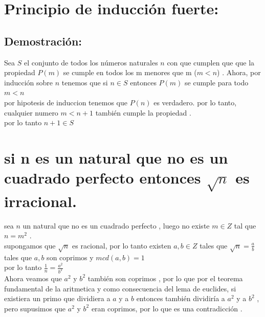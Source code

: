 \documentclass[10pt,a4paper]{article} %
\begin{document}
    \title{\rmfamily\normalfont{}}
    \author{}
    \date{\today}

    \maketitle


    \section{Principio de inducción fuerte:}
        \subsection{Demostración:}
            Sea $ S  $  el conjunto de todos los números naturales $ n  $  con
            que cumplen que
            que la propiedad  $ P(m)  $  se cumple en todos los m menores que m
            ($ m < n  $)
            .  Ahora, por inducción sobre $ n  $ tenemos que si $ n \in S  $
            entonces $ P(m)  $  se cumple para todo $ m < n  $
            \\ por hipotesis de induccion tenemos que $ P(n)  $ es verdadero.
            por lo tanto, cualquier numero $ m < n+1  $ también cumple la propiedad .
            \\ por lo tanto $ n +1 \in S  $
    \section{si n es un natural que no es un cuadrado perfecto entonces $ \sqrt{n}  $   es irracional.}
        sea $ n  $  un natural que no es un cuadrado perfecto , luego no existe
        $ m \in Z  $ tal que $ n = m ^{2}   $   .
        \\ supongamos que $ \sqrt{n}   $ es racional, por lo tanto existen $
        a,b \in Z  $ tales que $ \sqrt{n} = \frac{a}{b}   $ tales que $ a,b  $ son coprimos y $ mcd(a,b) = 1
        $
        \\ por lo tanto $ \frac{1}{n} = \frac{a ^{2 } }{b ^{2} }  $
        \\Ahora veamos que $ a ^{2}   $ y $ b ^{2}   $  también son coprimos ,
        por lo que por el teorema fundamental de la aritmetica y como
        consecuencia del lema de euclides, si existiera un primo que dividiera
        a $ a  $ y a $ b  $ entonces también dividiría a $ a ^{2}   $ y a $ b
        ^{2}   $   , pero supusimos que $ a ^{2}   $ y $ b ^{2}   $ eran
        coprimos, por lo que es una contradicción .
\end{document}
